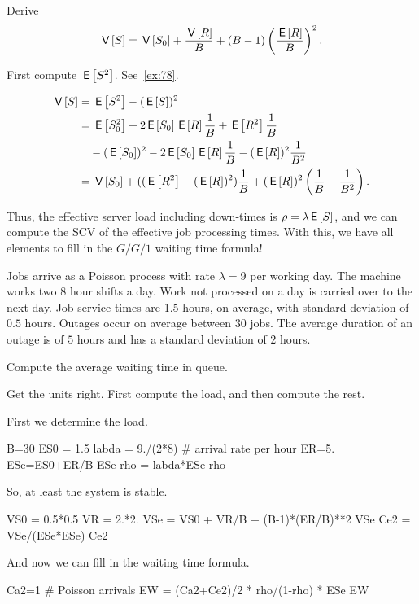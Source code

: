 \begin{exercise}
Derive 
\begin{equation}\label{eq:89} 
 \,\mathsf{V}\left[S\right] = \,\mathsf{V}\left[S_0\right] + \frac{\,\mathsf{V}\left[R\right]} B + (B-1)\left(\frac{\,\mathsf{E}\left[R\right]}{B}\right)^2.
\end{equation}
\begin{hint}
 First compute $\,\mathsf{E}\left[S^2\right]$. See~\cref{ex:78}.
\end{hint}
\begin{solution}
 \begin{equation*}
 \begin{split}
\,\mathsf{V}\left[S\right] 
&=\,\mathsf{E}\left[S^2\right] - (\,\mathsf{E}\left[S\right])^2 \\
&= \,\mathsf{E}\left[S_0^2\right] + 2 \,\mathsf{E}\left[S_0\right] \,\mathsf{E}\left[R\right]\frac 1B + \,\mathsf{E}\left[R^2\right]\frac 1B \\
&\quad - (\,\mathsf{E}\left[S_0\right])^2 - 2\,\mathsf{E}\left[S_0\right]\,\mathsf{E}\left[R\right] \frac 1 B - (\,\mathsf{E}\left[R\right])^2\frac1{B^2}\\
&= \,\mathsf{V}\left[S_0\right] + ((\,\mathsf{E}\left[R^2\right] - (\,\mathsf{E}\left[R\right])^2)\frac 1 B + (\,\mathsf{E}\left[R\right])^2\left(\frac 1B - \frac 1{B^2}\right).
 \end{split}
 \end{equation*}
\end{solution}
\end{exercise}


Thus, the effective server load including down-times is $\rho = \lambda \,\mathsf{E}\left[S\right]$, and we can compute the SCV of the effective job processing times.
With this, we have all elements to fill in the $G/G/1$ waiting time formula!


\begin{exercise}
 Jobs arrive as a Poisson process with rate $\lambda=9$ per working day.
 The machine works two $8$ hour shifts a day.
 Work not processed on a day is carried over to the next day.
 Job service times are 1.5 hours, on average, with standard deviation of $0.5$ hours.
 Outages occur on average between $30$ jobs.
The average duration of an outage  is of $5$ hours and has a standard deviation of $2$ hours.

 Compute the average waiting time in queue.
\begin{hint}
 Get the units right. First compute the load, and then compute the rest.
\end{hint}
\begin{solution}
 First we determine the load. 
 \begin{pyconsole}
B=30
ES0 = 1.5
labda = 9./(2*8) # arrival rate per hour
ER=5.
ESe=ES0+ER/B
ESe
rho = labda*ESe
rho
 \end{pyconsole}
So, at least the system is stable.

\begin{pyconsole}
VS0 = 0.5*0.5
VR = 2.*2.
VSe = VS0 + VR/B + (B-1)*(ER/B)**2
VSe
Ce2 = VSe/(ESe*ESe)
Ce2
\end{pyconsole}

And now we can fill in the waiting time formula.
\begin{pyconsole}
Ca2=1 # Poisson arrivals
EW = (Ca2+Ce2)/2 * rho/(1-rho) * ESe
EW 
\end{pyconsole}
\end{solution}
\end{exercise}


